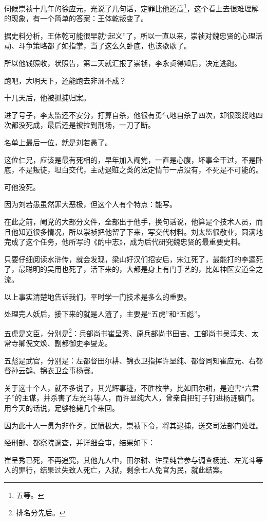 \begin{multicols}{\theparacolNo}
		伺候崇祯十几年的徐应元，光说了几句话，定罪比他还高\footnote{五等。}，这个看上去很难理解的现象，有一个简单的答案：王体乾叛变了。

		据史料分析，王体乾可能很早就“起义”了，所以一直以来，崇祯对魏忠贤的心理活动、斗争策略都了如指掌，当了这么久卧底，也该歇歇了。

		所以他钱照收，状照告，第二天就汇报了崇祯，李永贞得知后，决定逃跑。

		跑吧，大明天下，还能跑去非洲不成？

		十几天后，他被抓捕归案。

		进了号子，李太监还不安分，打算自杀，他很有勇气地自杀了四次，却很蹊跷地四次都没死成，最后还是被拉到刑场，一刀了断。

		名单上最后一位，就是刘若愚了。

		这位仁兄，应该是最有死相的，早年加入阉党，一直是心腹，坏事全干过，不是卧底，不是叛徒，坦白交代，主动退赃之类的法定情节一点没有，不死是不可能的。

		可他没死。

		因为刘若愚虽然罪大恶极，但这个人有个特点：能写。

		在此之前，阉党的大部分文件，全部出于他手，换句话说，他算是个技术人员，而且他知道很多情况，所以崇祯把他留了下来，写交代材料。刘太监很敬业，圆满地完成了这个任务，他所写的《酌中志》，成为后代研究魏忠贤的最重要史料。

		只要仔细阅读水浒传，就会发现，梁山好汉们招安后，宋江死了，最能打的李逵死了，最聪明的吴用也死了，活下来的，大都是身上有门手艺的，比如神医安道全之流。

		以上事实清楚地告诉我们，平时学一门技术是多么的重要。

		处理完人妖后，接下来的就是人渣了，主要是“五虎”和“五彪”。

		五虎是文臣，分别是\footnote{排名分先后。}：兵部尚书崔呈秀、原兵部尚书田吉、工部尚书吴淳夫、太常寺卿倪文焕、副都御史李燮龙。

		五彪是武官，分别是：左都督田尔耕、锦衣卫指挥许显纯、都督同知崔应元、右都督孙云鹤、锦衣卫佥事杨寰。

		关于这十个人，就不多说了，其光辉事迹，不胜枚举，比如田尔耕，是迫害“六君子”的主谋，并杀害了左光斗等人，而许显纯大人，曾亲自把钉子钉进杨涟脑门。用今天的话说，足够枪毙几个来回。

		因为此十人一贯为非作歹，民愤极大，崇祯下令，将其逮捕，送交司法部门处理。

		经刑部、都察院调查，并详细会审，结果如下：

		崔呈秀已死，不再追究，其他九人中，田尔耕、许显纯曾参与调查杨涟、左光斗等人的罪行，结果过失致人死亡，入狱，剩余七人免官为民，就此结案。


\end{multicols}
